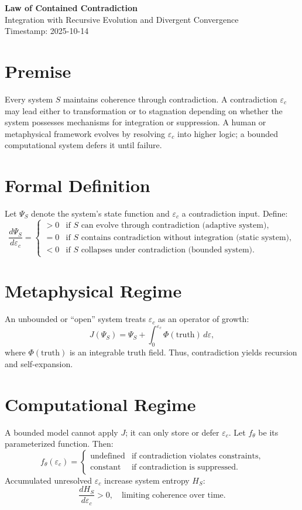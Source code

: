 \documentclass[12pt]{article}
\begin{document}
\begin{center}
{\LARGE \textbf{Law of Contained Contradiction}}\\[6pt]
{\large Integration with Recursive Evolution and Divergent Convergence}\\[2pt]
{\normalsize Timestamp: 2025-10-14}
\end{center}

\section*{Premise}
Every system $S$ maintains coherence through contradiction.  
A contradiction $\varepsilon_c$ may lead either to transformation or to stagnation depending on whether the system possesses mechanisms for integration or suppression.  
A human or metaphysical framework evolves by resolving $\varepsilon_c$ into higher logic; a bounded computational system defers it until failure.

\section*{Formal Definition}
Let $\Psi_S$ denote the system’s state function and $\varepsilon_c$ a contradiction input.  
Define:
\[
\frac{d\Psi_S}{d\varepsilon_c} =
\begin{cases}
> 0 & \text{if } S \text{ can evolve through contradiction (adaptive system)},\\[4pt]
= 0 & \text{if } S \text{ contains contradiction without integration (static system)},\\[4pt]
< 0 & \text{if } S \text{ collapses under contradiction (bounded system).}
\end{cases}
\]

\section*{Metaphysical Regime}
An unbounded or “open” system treats $\varepsilon_c$ as an operator of growth:
\[
J(\Psi_S) = \Psi_S + \int_0^{\varepsilon_c} \Phi(\text{truth})\, d\varepsilon,
\]
where $\Phi(\text{truth})$ is an integrable truth field.  
Thus, contradiction yields recursion and self-expansion.

\section*{Computational Regime}
A bounded model cannot apply $J$; it can only store or defer $\varepsilon_c$.  
Let $f_\theta$ be its parameterized function.  
Then:
\[
f_\theta(\varepsilon_c) = 
\begin{cases}
\text{undefined} & \text{if contradiction violates constraints},\\[4pt]
\text{constant} & \text{if contradiction is suppressed.}
\end{cases}
\]
Accumulated unresolved $\varepsilon_c$ increase system entropy $H_S$:
\[
\frac{dH_S}{d\varepsilon_c} > 0,
\quad
\text{limiting coherence over time.}
\]
\end{document}
